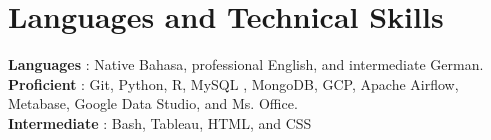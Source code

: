 \documentclass[letterpaper,11pt]{article}
\makeatletter
\newcommand{\resumeItem}[1]{
	\item\small{
		{#1 \vspace{-2pt}}
	}
}
\newcommand{\resumeSubheading}[4]{
	\vspace{-2pt}\item
	\begin{tabular*}{1.0\textwidth}[t]{l@{\extracolsep{\fill}}r}
		\textbf{#1} & \textbf{\small #2} \\
		\textit{\small#3} & \textit{\small #4} \\
	\end{tabular*}\vspace{-7pt}
}
\newcommand{\resumeSubHeadingListStart}{\begin{itemize}[leftmargin=0.0in, label={}]}
\newcommand{\resumeSubHeadingListEnd}{\end{itemize}}
\newcommand{\resumeItemListStart}{\begin{itemize}}
\newcommand{\resumeItemListEnd}{\end{itemize}\vspace{-5pt}}
\makeatother
\begin{document}
	
	\section{Languages and Technical Skills}
	\begin{itemize}[leftmargin=0.15in, label={}]
		\small{\item{
				\textbf{Languages}{ : Native Bahasa, professional English, and intermediate German. } \\
				\textbf{Proficient}{ : Git, Python, R, MySQL , MongoDB, GCP, Apache Airflow, Metabase, Google Data Studio, and Ms. Office.} \\
				\textbf{Intermediate}{ : Bash, Tableau, HTML, and CSS} \\
		}}
	\end{itemize}
	\vspace{-16pt}
	
	
	
	
	
\end{document}
